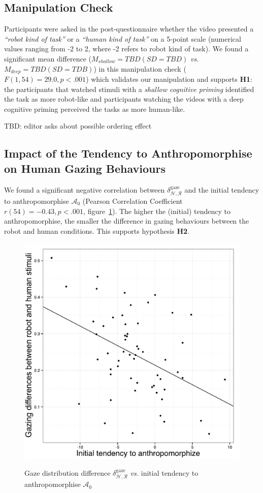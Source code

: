 \documentclass[lettersize, noapacite, twoside, HRI]{apa_HRI}
\newcommand{\vs}{\textit{vs.}\xspace}
\newcommand{\h}[1]{\textbf{H#1}\xspace}
\newcommand{\anti}{{$\mathcal{A}_0$\xspace}}
\begin{document}
\subsection{Manipulation Check}



Participants were asked in the post-questionnaire whether the video presented a
\emph{``robot kind of task''} or a \emph{``human kind of task''} on a 5-point
scale (numerical values ranging from -2 to 2, where -2 refers to robot kind of
task). We found a significant mean difference ($M_{shallow}=TBD (SD=TBD)$
\vs $M_{deep}=TBD (SD=TDB)$) in this
manipulation check ($F(1,54) = 29.0, p < .001$) which validates our manipulation
and supports \h{1}: the participants that watched stimuli with a \emph{shallow cognitive
priming} identified the task as more robot-like and participants watching
the videos with a deep cognitive priming perceived the tasks as more human-like.

TBD: editor asks about possible ordering effect

\subsection{Impact of the Tendency to Anthropomorphise on Human
Gazing Behaviours}

We found a significant negative correlation between
$\delta_{\mathcal{H},\mathcal{R}}^{\text{gaze}}$ and
the initial tendency to anthropomorphise \anti{} (Pearson Correlation Coefficient $r(54) = -0.43,
p < .001$, figure~\ref{h2}). The higher the (initial) tendency to anthropomorphise, the smaller
the difference in gazing behaviours between the robot and human conditions. This
supports hypothesis \h{2}.

\begin{figure}
    \centering
    \includegraphics[width=0.5\columnwidth]{H2}\label{GazeDifference-vs-ICA}
    \caption{Gaze distribution difference $\delta_{\mathcal{H},
    \mathcal{R}}^{\text{gaze}}$ \vs initial tendency to anthropomorphise \anti{}}
    \label{h2}
\end{figure}
\end{document}
